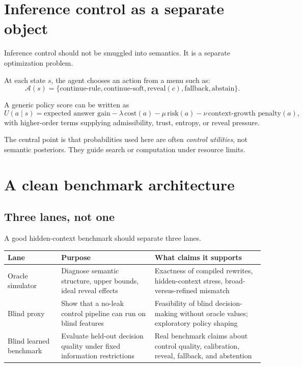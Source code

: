 \documentclass[11pt]{article}
\begin{document}
\section{Inference control as a separate object}
Inference control should not be smuggled into semantics. It is a separate optimization problem.

At each state $s$, the agent chooses an action from a menu such as:
\begin{equation}
\mathcal{A}(s) = \{\text{continue-rule},\text{continue-soft},\text{reveal}(c),\text{fallback},\text{abstain}\}.
\end{equation}

A generic policy score can be written as
\begin{equation}
U(a \mid s) = \text{expected answer gain} - \lambda\,\text{cost}(a) - \mu\,\text{risk}(a) - \nu\,\text{context-growth penalty}(a),
\end{equation}
with higher-order terms supplying admissibility, trust, entropy, or reveal pressure.

The central point is that probabilities used here are often \emph{control utilities}, not semantic posteriors. They guide search or computation under resource limits.

\section{A clean benchmark architecture}
\subsection{Three lanes, not one}
A good hidden-context benchmark should separate three lanes.

\begin{longtable}{p{}p{}p{}}
\toprule
\textbf{Lane} & \textbf{Purpose} & \textbf{What claims it supports} \\
\midrule
Oracle simulator & Diagnose semantic structure, upper bounds, ideal reveal effects & Exactness of compiled rewrites, hidden-context stress, broad-versus-refined mismatch \\
Blind proxy & Show that a no-leak control pipeline can run on blind features & Feasibility of blind decision-making without oracle values; exploratory policy shaping \\
Blind learned benchmark & Evaluate held-out decision quality under fixed information restrictions & Real benchmark claims about control quality, calibration, reveal, fallback, and abstention \\
\bottomrule
\end{longtable}
\end{document}
